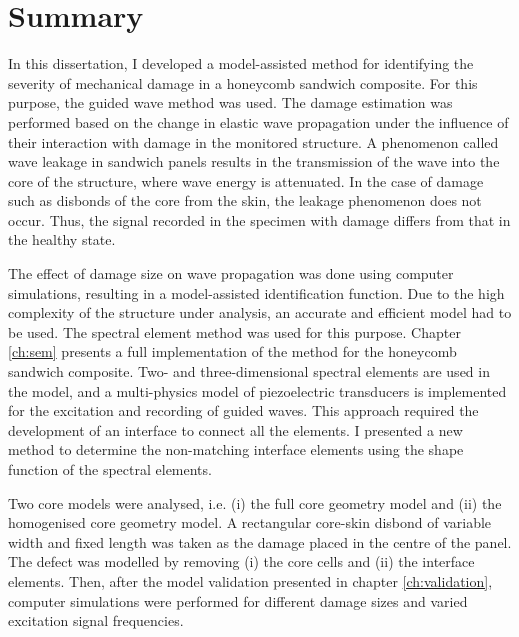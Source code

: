 
\chapter[Summary]{Summary}
\label{ch:summary}

In this dissertation, I developed a model-assisted method for identifying the severity of mechanical damage in a honeycomb sandwich composite. 
For this purpose, the guided wave method was used.
The damage estimation was performed based on the change in elastic wave propagation under the influence of their interaction with damage in the monitored structure.
A phenomenon called wave leakage in sandwich panels results in the transmission of the wave into the core of the structure, where wave energy is attenuated.
In the case of damage such as disbonds of the core from the skin, the leakage phenomenon does not occur.
Thus, the signal recorded in the specimen with damage differs from that in the healthy state.

The effect of damage size on wave propagation was done using computer simulations, resulting in a model-assisted identification function.
Due to the high complexity of the structure under analysis, an accurate and efficient model had to be used.
The spectral element method was used for this purpose.
Chapter \ref{ch:sem} presents a full implementation of the method for the honeycomb sandwich composite.
Two- and three-dimensional spectral elements are used in the model, and a multi-physics model of piezoelectric transducers is implemented for the excitation and recording of guided waves.
This approach required the development of an interface to connect all the elements.
I presented a new method to determine the non-matching interface elements using the shape function of the spectral elements.

Two core models were analysed, i.e. (i) the full core geometry model and (ii) the homogenised core geometry model.
A rectangular core-skin disbond of variable width and fixed length was taken as the damage placed in the centre of the panel.
The defect was modelled by removing (i) the core cells and (ii) the interface elements.
Then, after the model validation presented in chapter \ref{ch:validation}, computer simulations were performed for different damage sizes and varied excitation signal frequencies.

